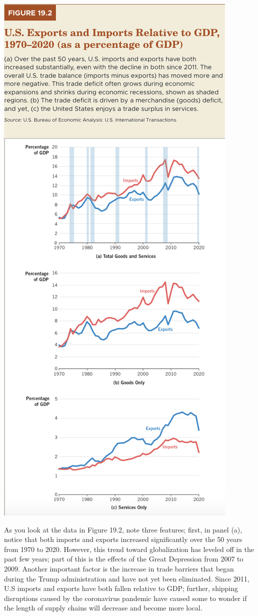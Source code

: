 \documentclass[11pt]{article} %
\begin{document}
\begin{center}
\includegraphics[scale=0.5]{images/Figure 19.2.png} 
\end{center}
As you look at the data in Figure 19.2, note three features; first, in panel (a), notice that both imports and exports increased significantly over the 50 years from 1970 to 2020. However, this trend toward globalization has leveled off in the past few years; part of this is the effects of the Great Depression from 2007 to 2009. Another important factor is the increase in trade barriers that began during the Trump administration and have not yet been eliminated. Since 2011, U.S imports and exports have both fallen relative to GDP; further, shipping disruptions caused by the coronavirus pandemic have caused some to wonder if the length of supply chains will decrease and become more local.
\end{document}
